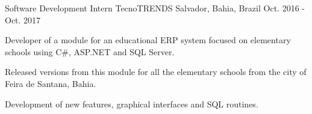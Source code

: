 \begin{cventries}
  \cventry
    {Software Development Intern} %
    {TecnoTRENDS} %
    {Salvador, Bahia, Brazil} %
    {Oct. 2016 - Oct. 2017} %
    {
      \begin{cvitems} %
        \item {Developer of a module for an educational ERP system focused on elementary schools using C\#, ASP.NET and SQL Server.}
        \item {Released versions from this module for all the elementary schools from the city of Feira de Santana, Bahia.}
        \item {Development of new features, graphical interfaces and SQL routines.}
      \end{cvitems}
    }

\end{cventries}

